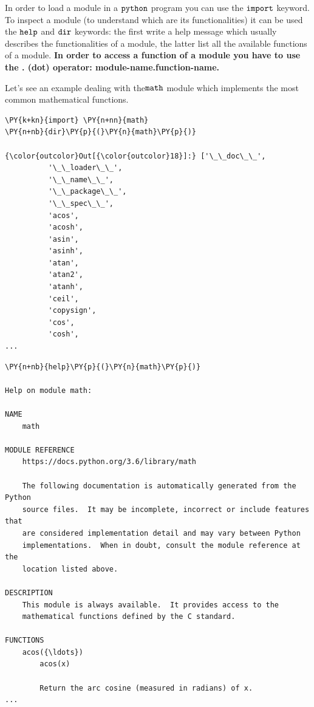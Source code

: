In order to load a module in a \(\tt{python}\) program you can use the \(\tt{import}\) keyword. To inspect a module (to understand which are its functionalities) it can be used the \(\tt{help}\) and \(\tt{dir}\) keywords: the first write a help message which usually describes the functionalities of a module, the latter list all the available functions of a module.
\textbf{In order to access a function of a module you have to use the . (dot) operator: module-name.function-name.}

Let's see an example dealing with the\(\tt{math}\) module which implements the most common mathematical functions.

\begin{tcolorbox}[breakable, size=fbox, boxrule=1pt, pad at break*=1mm, colback=cellbackground, colframe=cellborder]            
\begin{Verbatim}[commandchars=\\\{\}]
\PY{k+kn}{import} \PY{n+nn}{math}
\PY{n+nb}{dir}\PY{p}{(}\PY{n}{math}\PY{p}{)}

{\color{outcolor}Out[{\color{outcolor}18}]:} ['\_\_doc\_\_',
          '\_\_loader\_\_',
          '\_\_name\_\_',
          '\_\_package\_\_',
          '\_\_spec\_\_',
          'acos',
          'acosh',
          'asin',
          'asinh',
          'atan',
          'atan2',
          'atanh',
          'ceil',
          'copysign',
          'cos',
          'cosh',
...
\end{Verbatim}
\end{tcolorbox}

\begin{tcolorbox}[breakable, size=fbox, boxrule=1pt, pad at break*=1mm, colback=cellbackground, colframe=cellborder]            
\begin{Verbatim}[commandchars=\\\{\}]
\PY{n+nb}{help}\PY{p}{(}\PY{n}{math}\PY{p}{)}

Help on module math:

NAME
    math

MODULE REFERENCE
    https://docs.python.org/3.6/library/math

    The following documentation is automatically generated from the Python
    source files.  It may be incomplete, incorrect or include features that
    are considered implementation detail and may vary between Python
    implementations.  When in doubt, consult the module reference at the
    location listed above.

DESCRIPTION
    This module is always available.  It provides access to the
    mathematical functions defined by the C standard.

FUNCTIONS
    acos({\ldots})
        acos(x)

        Return the arc cosine (measured in radians) of x.
...
\end{Verbatim}
\end{tcolorbox}

